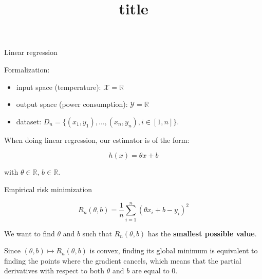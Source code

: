 \documentclass[usenames,dvipsnames]{beamer}
\title[FTML]{title}
\date{} %
\begin{document}
\begin{frame}
\titlepage %
\end{frame}

\begin{frame}{Linear regression}

    Formalization:
    \begin{itemize}
        \item input space (temperature): $\mathcal{X} = \mathbb{R}$
        \item output space (power consumption): $ \mathcal{Y} = \mathbb{R}$
	\item dataset: $D_n=\{(x_1, y_1), \dots, (x_n, y_n), i\in[1, n]\}$.
    \end{itemize}

    When doing linear regression, our estimator is of the form:

    \begin{equation}
        h(x) = \theta x + b
    \end{equation}

    with $\theta\in \mathbb{R}$, $b\in\mathbb{R}$.

\end{frame}

\begin{frame}{Empirical risk minimization}

    \begin{equation}
        R_n(\theta, b) = \frac{1}{n}\sum_{i=1}^{n} (\theta x_i+b-y_i)^2
    \end{equation}

    We want to find $\theta$ and $b$ such that $R_n(\theta, b)$ has the
    \textbf{smallest possible value}.

    Since $(\theta, b) \mapsto R_n(\theta, b)$ is convex, finding its global minimum is equivalent to finding the points where the gradient cancels, which means that the partial derivatives with respect to both $\theta$ and $b$ are equal to $0$.

\end{frame}
\end{document}
